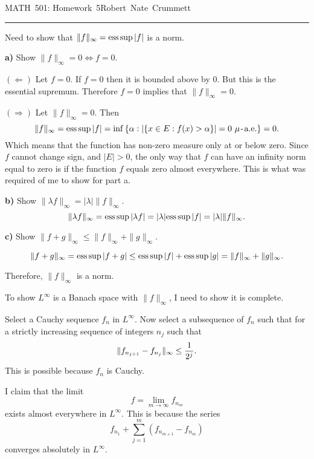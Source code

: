 


\def\reals{I\kern-4pt R}
\def\nats{I\kern-4pt N}
\let\oldexists\exists\def\exists{\oldexists\;}
\let\oldforall\forall\def\forall{\oldforall\,}
\def\qed{\vrule height 6pt width 6pt depth 0pt}
\def\esssup{{\rm ess}\sup}
\def\almosteverywhere{\,\,\mu\hbox{\kern1pt\rm-\kern1pt a.e.}}
\parindent 0pt
\parskip 2mm


MATH~501: Homework~5\hfill Robert~Nate~Crummett
\smallskip
\hrule



Need to show that $\|f\|_\infty=\esssup|f|$ is a norm.


{\bf a)} Show $\|f\|_\infty=0\Leftrightarrow f=0$. 

$(\Leftarrow)$ Let $f=0$.
If $f=0$ then it is bounded above by $0$.
But this is the essential supremum.
Therefore $f=0$ implies that $\|f\|_\infty=0$.

$(\Rightarrow)$ Let $\|f\|_\infty=0$.
Then 
$$\|f\|_\infty=\esssup|f|=\inf\left\{\alpha:\left|\left\{x\in E:f(x)>\alpha\right\}\right|=0\almosteverywhere\right\}=0.$$
Which means that the function has non-zero measure only at or below zero.
Since $f$ cannot change sign, and $|E|>0$, the only way that $f$ can have an infinity norm equal to zero is if the function $f$ equals zero almost everywhere.
This is what was required of me to show for part a.

{\bf b)} Show $\|\lambda f\|_\infty=|\lambda|\|f\|_\infty$. 
$$\|\lambda f\|_\infty=\esssup|\lambda f|=|\lambda|\esssup|f|=|\lambda|\|f\|_\infty.$$

{\bf c)} Show $\|f+g\|_\infty\leq\|f\|_\infty+\|g\|_\infty$.

$$\|f+g\|_\infty=\esssup|f+g|\leq\esssup|f|+\esssup|g|=\|f\|_\infty+\|g\|_\infty.$$

Therefore, $\|f\|_\infty$ is a norm.\hfill\qed\kern3pt


To show $L^\infty$ is a Banach space with $\|f\|_\infty$, I need to show it is complete.

Select a Cauchy sequence $f_n$ in $L^\infty$.
Now select a subsequence of $f_n$ such that for a strictly increasing sequence of integers $n_j$ such that
$$\|f_{n_{j+1}}-f_{n_j}\|_\infty\leq{1\over2^j}.$$
This is possible because $f_n$ is Cauchy.

I claim that the limit
$$f=\lim_{m\to\infty}f_{n_m}$$
exists almost everywhere in $L^\infty$.
This is because the series
$$f_{n_1}+\sum_{j=1}^m(f_{n_{m+1}}-f_{n_m})$$
converges absolutely in $L^\infty$.

